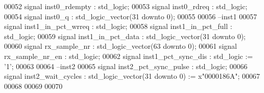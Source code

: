 \begin{DoxyCode}
00052    \textcolor{keywordflow}{signal} \textcolor{vhdlchar}{inst0_rdempty}       \textcolor{vhdlchar}{:} \textcolor{comment}{std\_logic};
00053    \textcolor{keywordflow}{signal} \textcolor{vhdlchar}{inst0_rdreq}         \textcolor{vhdlchar}{:} \textcolor{comment}{std\_logic};
00054    \textcolor{keywordflow}{signal} \textcolor{vhdlchar}{inst0_q}             \textcolor{vhdlchar}{:} \textcolor{comment}{std\_logic\_vector}\textcolor{vhdlchar}{(}\textcolor{vhdllogic}{}\textcolor{vhdllogic}{31} \textcolor{keywordflow}{downto} \textcolor{vhdllogic}{}\textcolor{vhdllogic}{0}\textcolor{vhdlchar}{)};
00055    
00056 \textcolor{keyword}{   --inst1}
00057    \textcolor{keywordflow}{signal} \textcolor{vhdlchar}{inst1_in_pct_wrreq}  \textcolor{vhdlchar}{:} \textcolor{comment}{std\_logic};
00058    \textcolor{keywordflow}{signal} \textcolor{vhdlchar}{inst1_in_pct_full}   \textcolor{vhdlchar}{:} \textcolor{comment}{std\_logic};
00059    \textcolor{keywordflow}{signal} \textcolor{vhdlchar}{inst1_in_pct_data}   \textcolor{vhdlchar}{:} \textcolor{comment}{std\_logic\_vector}\textcolor{vhdlchar}{(}\textcolor{vhdllogic}{}\textcolor{vhdllogic}{31} \textcolor{keywordflow}{downto} \textcolor{vhdllogic}{}\textcolor{vhdllogic}{0}\textcolor{vhdlchar}{)};
00060    \textcolor{keywordflow}{signal} \textcolor{vhdlchar}{rx_sample_nr}        \textcolor{vhdlchar}{:} \textcolor{comment}{std\_logic\_vector}\textcolor{vhdlchar}{(}\textcolor{vhdllogic}{}\textcolor{vhdllogic}{63} \textcolor{keywordflow}{downto} \textcolor{vhdllogic}{}\textcolor{vhdllogic}{0}\textcolor{vhdlchar}{)};
00061    \textcolor{keywordflow}{signal} \textcolor{vhdlchar}{rx_sample_nr_en}     \textcolor{vhdlchar}{:} \textcolor{comment}{std\_logic};
00062    \textcolor{keywordflow}{signal} \textcolor{vhdlchar}{inst1_pct_sync_dis}  \textcolor{vhdlchar}{:} \textcolor{comment}{std\_logic} \textcolor{vhdlchar}{:=} \textcolor{vhdlchar}{'}\textcolor{vhdllogic}{}\textcolor{vhdllogic}{1}\textcolor{vhdlchar}{'};
00063    
00064 \textcolor{keyword}{   --inst2}
00065    \textcolor{keywordflow}{signal} \textcolor{vhdlchar}{inst2_pct_sync_pulse}   \textcolor{vhdlchar}{:} \textcolor{comment}{std\_logic};
00066    \textcolor{keywordflow}{signal} \textcolor{vhdlchar}{inst2_wait_cycles}      \textcolor{vhdlchar}{:} \textcolor{comment}{std\_logic\_vector}\textcolor{vhdlchar}{(}\textcolor{vhdllogic}{}\textcolor{vhdllogic}{31} \textcolor{keywordflow}{downto} \textcolor{vhdllogic}{}\textcolor{vhdllogic}{0}\textcolor{vhdlchar}{)} \textcolor{vhdlchar}{:=} \textcolor{vhdlchar}{x}\textcolor{vhdllogic}{"0000186A"};
00067    
00068 
00069 
00070    

\end{DoxyCode}
